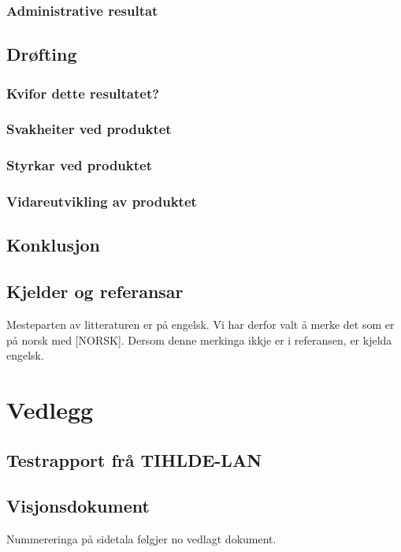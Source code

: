 \documentclass[nynorsk,12pt,a4paper,oneside]{book}
\begin{document}
\section{Administrative resultat}


\chapter{Drøfting}
\section{Kvifor dette resultatet?}
\section{Svakheiter ved produktet}
\section{Styrkar ved produktet}
\section{Vidareutvikling av produktet}
\chapter{Konklusjon}
\chapter{Kjelder og referansar}
Mesteparten av litteraturen er på engelsk. Vi har derfor valt å merke det som er på norsk med [NORSK]. Dersom denne merkinga ikkje er i referansen, er kjelda engelsk. 


{}

\part{Vedlegg}
\appendix 
\chapter{Testrapport frå TIHLDE-LAN}
\chapter{Visjonsdokument}
	Nummereringa på sidetala følgjer no vedlagt dokument.
	
	
\end{document}
